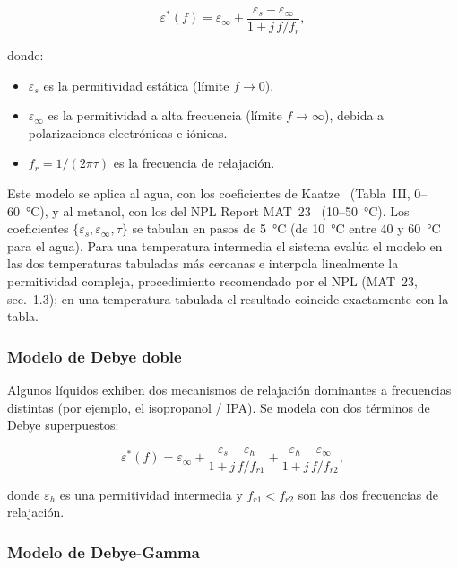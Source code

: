 \begin{equation}
    \varepsilon^*(f) = \varepsilon_\infty
                     + \frac{\varepsilon_s - \varepsilon_\infty}{1 + j\,f / f_r},
    \label{eq:debye_simple}
\end{equation}

\noindent donde:
\begin{itemize}
    \item $\varepsilon_s$ es la permitividad estática (límite $f \to 0$).
    \item $\varepsilon_\infty$ es la permitividad a alta frecuencia (límite $f \to \infty$),
          debida a polarizaciones electrónicas e iónicas.
    \item $f_r = 1/(2\pi\tau)$ es la frecuencia de relajación.
\end{itemize}

Este modelo se aplica al agua, con los coeficientes de Kaatze~\cite{kaatze1989}
(Tabla~III, 0--60~°C), y al metanol, con los del NPL Report MAT~23~\cite{gregory2012}
(10--50~°C). Los coeficientes $\{\varepsilon_s, \varepsilon_\infty, \tau\}$ se tabulan
en pasos de 5~°C (de 10~°C entre 40 y 60~°C para el agua). Para una temperatura
intermedia el sistema evalúa el modelo en las dos temperaturas tabuladas más
cercanas e interpola linealmente la permitividad compleja, procedimiento
recomendado por el NPL (MAT~23, sec.~1.3); en una temperatura tabulada el
resultado coincide exactamente con la tabla.

\subsubsection{Modelo de Debye doble}

Algunos líquidos exhiben dos mecanismos de relajación dominantes a frecuencias
distintas (por ejemplo, el isopropanol / IPA). Se modela con dos términos de Debye
superpuestos:

\begin{equation}
    \varepsilon^*(f) = \varepsilon_\infty
                     + \frac{\varepsilon_s - \varepsilon_h}{1 + j\,f / f_{r1}}
                     + \frac{\varepsilon_h - \varepsilon_\infty}{1 + j\,f / f_{r2}},
    \label{eq:debye_doble}
\end{equation}

\noindent donde $\varepsilon_h$ es una permitividad intermedia y $f_{r1} < f_{r2}$
son las dos frecuencias de relajación.

\subsubsection{Modelo de Debye-Gamma}

